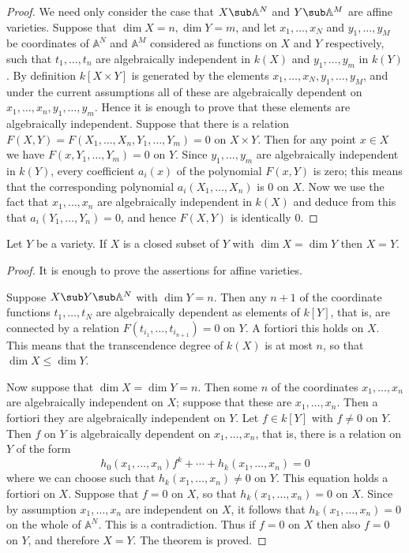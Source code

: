 \begin{proof}
We need only consider the case that $X\sub\mathbb{A}^N$ and $Y\sub\mathbb{A}^M$ are affine varieties. Suppose that $\dim X=n,\dim Y=m$, and let $x_1,\dots,x_N$ and $y_1,\dots,y_M$ be coordinates of $\mathbb{A}^N$ and $\mathbb{A}^M$ considered as functions on $X$ and $Y$ respectively, such that $t_1,\dots,t_n$ are algebraically independent in $k(X)$ and $y_1,\dots,y_m$ in $k(Y)$. By definition $k[X\times Y]$ is generated by the elements $x_1,\dots,x_N,y_1,\dots,y_M$, and under the current assumptions all of these are algebraically dependent on $x_1,\dots,x_n,y_1,\dots,y_m$. Hence it is enough to prove that these elements are algebraically independent. Suppose that there is a relation $F(X,Y)=F(X_1,\dots,X_n,Y_1,\dots,Y_m)=0$ on $X\times Y$. Then for any point $x\in X$ we have $F(x,Y_1,\dots,Y_m)=0$ on $Y$. Since $y_1,\dots,y_m$ are algebraically independent in $k(Y)$, every coefficient $a_i(x)$ of the polynomial $F(x,Y)$ is zero; this means that the corresponding polynomial $a_i(X_1,\dots,X_n)$ is $0$ on $X$. Now we use the fact that $x_1,\dots,x_n$ are algebraically independent in $k(X)$ and deduce from this that $a_i(Y_1,\dots,Y_n)=0$, and hence $F(X,Y)$ is identically 0.
\end{proof}
\begin{theorem}\label{dimension monotone}
Let $Y$ be a variety. If $X$ is a closed subset of $Y$ with $\dim X=\dim Y$ then $X=Y$.
\end{theorem}
\begin{proof}
It is enough to prove the assertions for affine varieties.\par
Suppose $X\sub Y\sub\mathbb{A}^N$ with $\dim Y=n$. Then any $n+1$ of the coordinate functions $t_1,\dots,t_N$ are algebraically dependent as elements of $k[Y]$, that is, are connected by a relation $F(t_{i_1},\dots,t_{i_{n+1}})=0$ on $Y$. A fortiori this holds on $X$. This means that the transcendence degree of $k(X)$ is at most $n$, so that $\dim X\leq\dim Y$.\par
Now suppose that $\dim X=\dim Y=n$. Then some $n$ of the coordinates $x_1,\dots,x_n$ are algebraically independent on $X$; suppose that these are $x_1,\dots,x_n$. Then a fortiori they are algebraically independent on $Y$. Let $f\in k[Y]$ with $f\neq 0$ on $Y$. Then $f$ on $Y$ is algebraically dependent on $x_1,\dots,x_n$, that is, there is a relation on $Y$ of the form
\[h_0(x_1,\dots,x_n)f^k+\cdots+h_k(x_1,\dots,x_n)=0\]
where we can choose such that $h_k(x_1,\dots,x_n)\neq 0$ on $Y$. This equation holds a fortiori on $X$. Suppose that $f=0$ on $X$, so that $h_k(x_1,\dots,x_n)=0$ on $X$. Since by assumption $x_1,\dots,x_n$ are independent on $X$, it follows that $h_k(x_1,\dots,x_n)=0$ on the whole of $\mathbb{A}^N$. This is a contradiction. Thus if $f=0$ on $X$ then also $f=0$ on $Y$, and therefore $X=Y$. The theorem is proved.
\end{proof}
